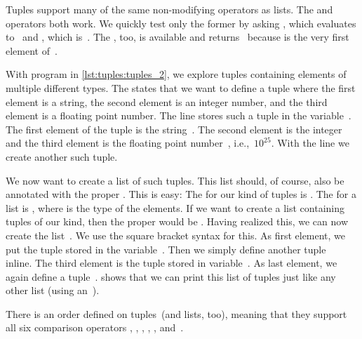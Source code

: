 Tuples support many of the same non-modifying operators as lists.
The  and  operators both work.
We quickly test only the former by asking , which evaluates to~ and , which is~.
The , too, is available and  returns~ because  is the very first element of~.
%
\begin{sloppypar}%
With program  in \cref{lst:tuples:tuples_2}, we explore tuples containing elements of multiple different types.
The   states that we want to define a tuple where the first element is a string, the second element is an integer number, and the third element is a floating point number.
The line  stores such a tuple in the variable~.
The first element of the tuple is the string~.
The second element is the integer~ and the third element is the floating point number~, i.e.,~$10^{25}$.
With the line  we create another such tuple.%
\end{sloppypar}%
%
\begin{sloppypar}%
We now want to create a list of such tuples.
This list should, of course, also be annotated with the proper .
This is easy:
The  for our kind of tuples is .
The  for a list is , where  is the type of the elements.
If we want to create a list containing tuples of our kind, then the proper  would be .
Having realized this, we can now create the list~.
We use the square bracket syntax for this.
As first element, we put the tuple stored in the variable~.
Then we simply define another tuple~ inline.
The third element is the tuple stored in variable~.
As last element, we again define a tuple~.
 shows that we can print this list of tuples just like any other list (using an~).%
\end{sloppypar}%
%
There is an order defined on tuples~(and lists, too), meaning that they support all six comparison operators \pythonilIdx{<}, \pythonilIdx{<=}, \pythonilIdx{==}, \pythonilIdx{>=}, \pythonilIdx{>}, and~\pythonil{!=}.
